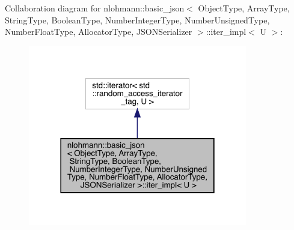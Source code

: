 Collaboration diagram for nlohmann\+::basic\+\_\+json$<$ Object\+Type, Array\+Type, String\+Type, Boolean\+Type, Number\+Integer\+Type, Number\+Unsigned\+Type, Number\+Float\+Type, Allocator\+Type, J\+S\+O\+N\+Serializer $>$\+::iter\+\_\+impl$<$ U $>$\+:\nopagebreak
\begin{figure}[H]
\begin{center}
\leavevmode
\includegraphics[width=271pt]{classnlohmann_1_1basic__json_1_1iter__impl__coll__graph}
\end{center}
\end{figure}

